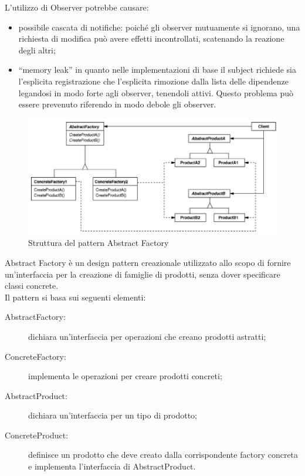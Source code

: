 			L’utilizzo di Observer potrebbe causare:
			\begin{itemize}
			\item possibile cascata di notifiche: poiché gli observer mutuamente si ignorano, una richiesta di modifica può avere effetti incontrollati, scatenando la reazione degli altri;
			\item “memory leak” in quanto nelle implementazioni di base il subject richiede sia l’esplicita registrazione che l’esplicita rimozione dalla lista delle dipendenze legandosi in modo forte agli observer, tenendoli attivi. Questo problema può essere prevenuto riferendo in modo debole gli observer.
			\end{itemize}
 \label{app:abstractfactory}
		\begin{figure}[H]\centering
        \includegraphics[scale=0.7]{SpecificaTecnica/Pics/AbstractFactory}
        \caption{Struttura del pattern Abstract Factory}
		\end{figure}
Abstract Factory è un design pattern creazionale utilizzato allo scopo di fornire un'interfaccia per la creazione di famiglie di prodotti, senza dover specificare classi concrete.\\
Il pattern si basa sui seguenti elementi:
\begin{description}
\item[AbstractFactory:] dichiara un'interfaccia per operazioni che creano prodotti astratti;
\item[ConcreteFactory:] implementa le operazioni per creare prodotti concreti;
\item[AbstractProduct:] dichiara un'interfaccia per un tipo di prodotto;
\item[ConcreteProduct:] definisce un prodotto che deve creato dalla corrispondente factory concreta e implementa l'interfaccia di AbstractProduct.
\end{description}
